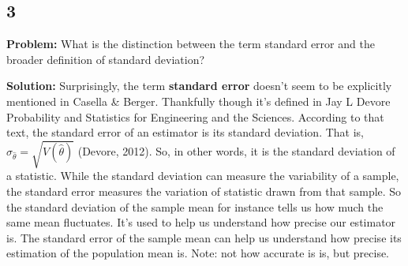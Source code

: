 \subsection*{3}

\noindent\textbf{Problem:} What is the distinction between the term standard error and the broader definition of standard deviation?

\noindent\textbf{Solution:} Surprisingly, the term \textbf{standard error} doesn't seem to be explicitly mentioned in Casella \& Berger. Thankfully though it's defined in Jay L Devore Probability and Statistics for Engineering and the Sciences. According to that text, the standard error of an estimator is its standard deviation. That is, $\sigma_{\hat{\theta}} = \sqrt{V(\hat{\theta})}$ (Devore, 2012). So, in other words, it is the standard deviation of a statistic. While the standard deviation can measure the variability of a sample, the standard error measures the variation of statistic drawn from that sample. So the standard deviation of the sample mean for instance tells us how much the same mean fluctuates. It's used to help us understand how precise our estimator is. The standard error of the sample mean can help us understand how precise its estimation of the population mean is. Note: not how accurate is is, but precise. 

